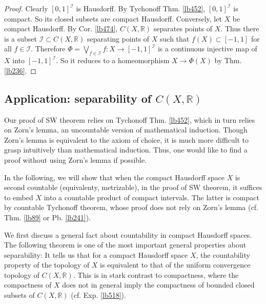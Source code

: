 \documentclass[12pt,b5paper,notitlepage]{article}
\theoremstyle{definition}
\theoremstyle{plain}
\newcommand{\scr}{\mathscr}
\newcommand{\Rbb}{\mathbb R}
\numberwithin{equation}{section}
\begin{document}
\begin{proof}
Clearly $[0,1]^{\scr I}$ is Hausdorff. By Tychonoff Thm. \ref{lb452}, $[0,1]^{\scr I}$ is compact. So its closed subsets are compact Hausdorff. Conversely, let $X$ be compact Hausdorff. By Cor. \ref{lb474}, $C(X,\Rbb)$ separates points of $X$. Thus there is a subset $\scr I\subset C(X,\Rbb)$ separating points of $X$ such that $f(X)\subset[-1,1]$ for all $f\in\scr I$. Therefore $\Phi=\bigvee_{f\in\scr I}f:X\rightarrow[-1,1]^{\scr I}$ is a continuous injective map of $X$ into $[-1,1]^{\scr I}$. So it reduces to a homeomorphism $X\rightarrow\Phi(X)$ by Thm. \ref{lb236}.
\end{proof}









\subsection{Application: separability of $C(X,\Rbb)$}\label{lb513}


Our proof of SW theorem relies on Tychonoff Thm. \ref{lb452}, which in turn relies on Zorn's lemma, an uncountable version of mathematical induction. Though Zorn's lemma is equivalent to the axiom of choice, it is much more difficult to grasp intuitively than mathematical induction. Thus, one would like to find a proof without using Zorn's lemma if possible. 

In the following, we will show that when the compact Hausdorff space $X$ is second countable (equivalenty, metrizable), in the proof of SW theorem, it suffices to embed $X$ into a countable product of compact intervals. The latter is compact by countable Tychonoff theorem, whose proof does not rely on Zorn's lemma (cf. Thm. \ref{lb89} or Pb. \ref{lb241}). 

We first discuss a general fact about countability in compact Hausdorff spaces. The following theorem is one of the most important general properties about separability: It tells us that for a compact Hausdorff space $X$, the countability property of the topology of $X$ is equivalent to that of the uniform convergence topology of $C(X,\Rbb)$. %
This is in stark contrast to compactness, where the compactness of $X$ does not in general imply the compactness of bounded closed subsets of  $C(X,\Rbb)$  (cf. Exp. \ref{lb518}).
\end{document}
